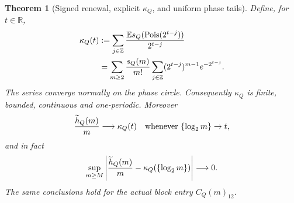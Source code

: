 \documentclass[11pt]{article}
\numberwithin{equation}{section}
\newtheorem{theorem}{Theorem}[section]
\newcommand{\E}{\mathbb E}\newcommand{\Pp}{\mathbb P}
\newcommand{\1}{\mathbf 1}\newcommand{\F}{\mathcal F}\newcommand{\D}{\mathcal D}
\begin{document}
\begin{theorem}[Signed renewal, explicit $\kappa_Q$, and uniform phase tails]
\label{thm:mixed-kappa-d}
Define, for $t\in\mathbb R$,
\begin{align}
 \kappa_Q(t)
 &:=\sum_{j\in\mathbb Z}{\E s_Q(\operatorname {Pois}(2^{t-j}))\over2^{t-j}}
                                                               \label{eq:kappa-pois-d}\\
 &=\sum_{m\ge2}{s_Q(m)\over m!}
   \sum_{j\in\mathbb Z}(2^{t-j})^{m-1}e^{-2^{t-j}}.    \label{eq:kappa-series-d}
\end{align}
The series converge normally on the phase circle.  Consequently $\kappa_Q$
is finite, bounded, continuous and one-periodic.  Moreover
\begin{equation}
 {\widetilde h_Q(m)\over m}\longrightarrow\kappa_Q(t)
 \quad\hbox{whenever }\{\log_2m\}\to t,               \label{eq:h-phase-d}
\end{equation}
and in fact
\begin{equation}
 \sup_{m\ge M}\left|{\widetilde h_Q(m)\over m}
       -\kappa_Q(\{\log_2m\})\right|\longrightarrow0. \label{eq:h-uniform-phase-d}
\end{equation}
The same conclusions hold for the actual block entry $C_Q(m)_{12}$.
\end{theorem}
\end{document}
